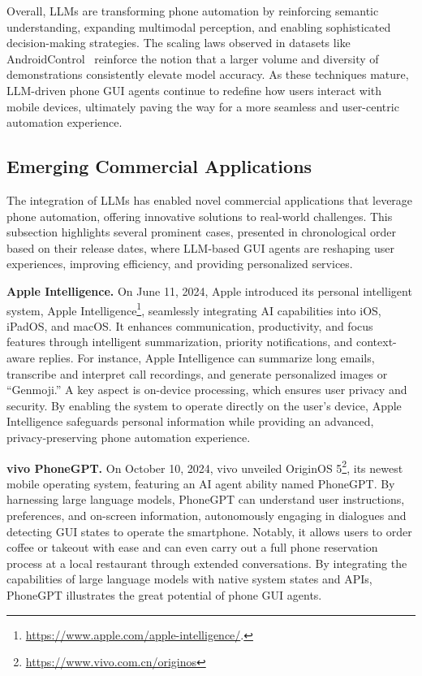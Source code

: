 Overall, LLMs are transforming phone automation by reinforcing semantic understanding, expanding multimodal perception, and enabling sophisticated decision-making strategies. The scaling laws observed in datasets like AndroidControl~\cite{li2024androidcontrol} reinforce the notion that a larger volume and diversity of demonstrations consistently elevate model accuracy. As these techniques mature, LLM-driven phone GUI agents continue to redefine how users interact with mobile devices, ultimately paving the way for a more seamless and user-centric automation experience.


\subsection{Emerging Commercial Applications}

The integration of LLMs has enabled novel commercial applications that leverage phone automation, offering innovative solutions to real-world challenges. This subsection highlights several prominent cases, presented in chronological order based on their release dates, where LLM-based GUI agents are reshaping user experiences, improving efficiency, and providing personalized services.


\noindent\textbf{Apple Intelligence.}
On June 11, 2024, Apple introduced its personal intelligent system, Apple Intelligence\footnote{\href{https://www.apple.com/apple-intelligence/}{https://www.apple.com/apple-intelligence/}.}, seamlessly integrating AI capabilities into iOS, iPadOS, and macOS. It enhances communication, productivity, and focus features through intelligent summarization, priority notifications, and context-aware replies. For instance, Apple Intelligence can summarize long emails, transcribe and interpret call recordings, and generate personalized images or “Genmoji.” A key aspect is on-device processing, which ensures user privacy and security. By enabling the system to operate directly on the user’s device, Apple Intelligence safeguards personal information while providing an advanced, privacy-preserving phone automation experience.


\noindent\textbf{vivo PhoneGPT.}
On October 10, 2024, vivo unveiled OriginOS 5\footnote{\href{https://www.vivo.com.cn/originos}{https://www.vivo.com.cn/originos}}, its newest mobile operating system, featuring an AI agent ability named PhoneGPT. By harnessing large language models, PhoneGPT can understand user instructions, preferences, and on-screen information, autonomously engaging in dialogues and detecting GUI states to operate the smartphone. Notably, it allows users to order coffee or takeout with ease and can even carry out a full phone reservation process at a local restaurant through extended conversations. By integrating the capabilities of large language models with native system states and APIs, PhoneGPT illustrates the great potential of phone GUI agents.


